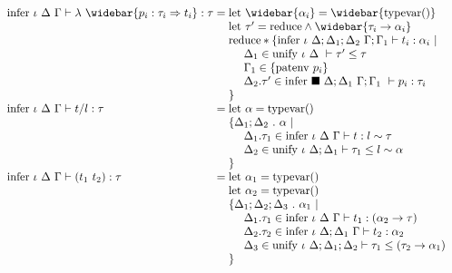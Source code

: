 \documentclass[manuscript]{acmart}
\begin{document}
\[\begin{array}{l @{} l}
    \text{infer } \iota\ \Delta\ \Gamma \vdash 
    \lambda\ \widebar{p_i : \tau_i \Rightarrow t_i} : \tau
    &{} =
    \begin{array}[t]{@{} l}
      \text{let } \widebar{\alpha_i} = \widebar{\text{typevar}()}
      \\
      \text{let } \tau' = \text{reduce} \wedge 
      \widebar{\tau_i \rightarrow \alpha_i }
      \\
      \text{reduce} * \{
      \text{infer } \iota\ \Delta;\Delta_1;\Delta_2\ \Gamma;\Gamma_1 \vdash t_i : \alpha_i\ |\ 
      \\
      \ \ \ \ \Delta_1 \in \text{unify } \iota\ \Delta\ \vdash \tau' \leq \tau
      \\
      \ \ \ \ \Gamma_1 \in \{\text{patenv } p_i\}
      \\
      \ \ \ \ \Delta_2.\tau' \in \text{infer } \blacksquare\ \Delta;\Delta_1\ \Gamma;\Gamma_1\ \vdash p_i : \tau_i
      \\
      \}
      \\
    \end{array}
    \\

    \text{infer } \iota\ \Delta\ \Gamma \vdash 
    t/l : \tau
    &{} =
    \begin{array}[t]{@{} l}
      \text{let } \alpha = \text{typevar}()
      \\
      \{ \Delta_1;\Delta_2\ .\ \alpha \ |\
      \\
      \ \ \ \ \Delta_1.\tau_1 \in \text{infer } \iota\ \Delta\ \Gamma \vdash t : l \sim \tau 
      \\
      \ \ \ \ \Delta_2 \in \text{unify } \iota\ \Delta;\Delta_1 \vdash \tau_1 \leq l \sim \alpha
      \\
      \}
    \end{array}
    \\

    \text{infer } \iota\ \Delta\ \Gamma \vdash 
    (t_1\ t_2) : \tau
    &{} =
    \begin{array}[t]{@{} l}
      \text{let } \alpha_1 = \text{typevar}()
      \\
      \text{let } \alpha_2 = \text{typevar}()
      \\
      \{ \Delta_1;\Delta_2;\Delta_3\ .\ \alpha_1 \ |\
      \\
      \ \ \ \ \Delta_1.\tau_1 \in \text{infer } \iota\ \Delta\ \Gamma \vdash t_1 : (\alpha_2 \rightarrow \tau) 
      \\
      \ \ \ \ \Delta_2.\tau_2 \in \text{infer } \iota\ \Delta;\Delta_1\ \Gamma \vdash t_2 : \alpha_2
      \\
      \ \ \ \ \Delta_3 \in \text{unify } \iota\ \Delta;\Delta_1;\Delta_2 \vdash 
      \tau_1 \leq (\tau_2 \rightarrow \alpha_1)
      \\
      \}
    \end{array}
    \\


\end{array}\]
\end{document}
